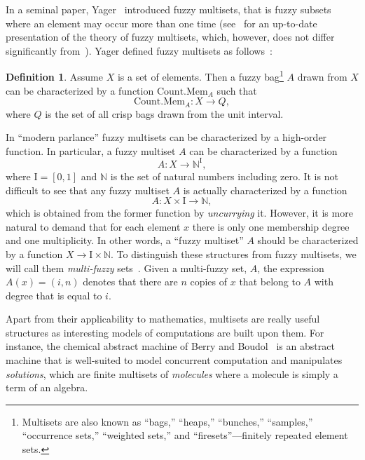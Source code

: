 \documentclass{amsart}
\theoremstyle{definition}
\newtheorem{definition}[theorem]{Definition}
\begin{document}
In a seminal paper, Yager~\cite{yager86} introduced fuzzy multisets, that is
fuzzy subsets where an element may occur more than one time 
(see~\cite{miyamoto04} for an up-to-date presentation of the theory of fuzzy 
multisets, which, however, does not differ significantly 
from~\cite{miyamoto01}). Yager defined fuzzy multisets as follows~\cite{yager86}:
\begin{definition}
Assume $X$ is a set of elements. Then a fuzzy bag\footnote{Multisets are also known
as ``bags,'' ``heaps,'' ``bunches,'' ``samples,'' ``occurrence sets,''
``weighted sets,'' and ``firesets''---finitely repeated element sets.} $A$ 
drawn from $X$ can be characterized by a function 
$\mathrm{Count}.\mathrm{Mem}_{A}$ such that
\begin{displaymath}
\mathrm{Count}.\mathrm{Mem}_{A}:X\rightarrow Q,
\end{displaymath} 
where $Q$ is the set of all crisp bags drawn from the unit interval.
\end{definition}
In ``modern parlance'' fuzzy multisets can be characterized by a high-order 
function. In particular, a fuzzy multiset $A$ can be characterized by a 
function
\begin{displaymath}
A:X\rightarrow\mathbb{N}^{\mathrm{I}},
\end{displaymath}  
where $\mathrm{I}=[0,1]$ and $\mathbb{N}$ is the set of natural numbers
including zero. It is not difficult to see that any fuzzy multiset $A$ is 
actually characterized by a function 
\begin{displaymath}
A:X\times\mathrm{I}\rightarrow\mathbb{N},
\end{displaymath}
which is obtained from the former function by {\em uncurrying} it. However,
it is more natural to demand that for each element $x$ there is only one 
membership degree and one multiplicity. In other words, a ``fuzzy multiset'' $A$ 
should be characterized by a function $X\rightarrow\mathrm{I}\times\mathbb{N}$. 
To distinguish these structures from fuzzy multisets, we will call them {\em multi-fuzzy}
sets~\cite{syropoulos06}. Given a multi-fuzzy set, $A$, the expression $A(x)=(i,n)$ denotes 
that there are $n$ copies of $x$ that belong to $A$ with degree that is equal to $i$. 

Apart from their applicability to mathematics, multisets are really
useful structures as interesting models of computations are built upon them.
For instance, the chemical abstract machine of Berry and Boudol~\cite{cham}
is an abstract machine that is well-suited to model
concurrent computation and manipulates {\em solutions}, which are finite
multisets of {\em molecules} where a molecule is simply a term of an algebra.
\end{document}

